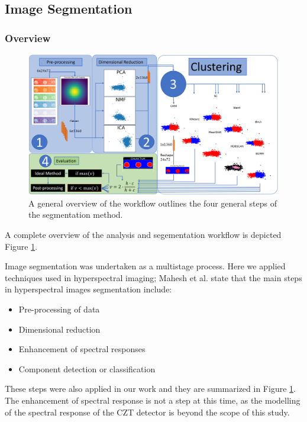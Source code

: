 \documentclass[a4paper,11pt]{article}
\begin{document}
\subsection{Image Segmentation}
\subsubsection{Overview}

\begin{figure}[htbp]

\includegraphics[width=\textwidth]{figures/flow_chart.png}

\caption{A general overview of the workflow outlines the four general steps of the segmentation method.}
\label{overview}
\end{figure}

\noindent A complete overview of the analysis and segementation workflow is depicted Figure \ref{overview}.

Image segmentation was undertaken as a multistage process. Here we applied techniques used in hyperspectral imaging; Mahesh et al. \cite{Mahesh2015HyperspectralMaterials} state that the main steps in hyperspectral images segmentation include:
\begin{itemize}
\setlength\itemsep{0em}
\item Pre-processing of data 
\item Dimensional reduction
\item Enhancement of spectral responses
\item Component detection or classification 
\end{itemize}
These steps were also applied in our work and they are summarized in Figure \ref{overview}. The enhancement of spectral response is not a step at this time, as the modelling of the spectral response of the CZT detector is beyond the scope of this study.
\end{document}
